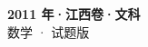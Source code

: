 \documentclass[zihao=-4, a4paper]{ctexart}
\begin{document}
\begin{center}
  {\Large\bfseries 2011 年·江西卷·文科}\\[4pt]
  {\large 数学 · 试题版}
\end{center}
\medskip
{}

\end{document}
